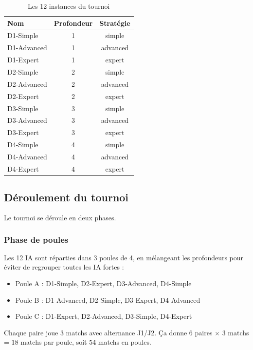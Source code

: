 \documentclass[a4paper, 12pt]{report}
\begin{document}
\begin{table}[H]
\centering
\caption{Les 12 instances du tournoi}
\label{tab:participants}
\begin{tabular}{lcc}
\toprule
\textbf{Nom} & \textbf{Profondeur} & \textbf{Stratégie} \\
\midrule
D1-Simple & 1 & simple \\
D1-Advanced & 1 & advanced \\
D1-Expert & 1 & expert \\
D2-Simple & 2 & simple \\
D2-Advanced & 2 & advanced \\
D2-Expert & 2 & expert \\
D3-Simple & 3 & simple \\
D3-Advanced & 3 & advanced \\
D3-Expert & 3 & expert \\
D4-Simple & 4 & simple \\
D4-Advanced & 4 & advanced \\
D4-Expert & 4 & expert \\
\bottomrule
\end{tabular}
\end{table}

\subsection{Déroulement du tournoi}

Le tournoi se déroule en deux phases.

\subsubsection{Phase de poules}

Les 12 IA sont réparties dans 3 poules de 4, en mélangeant les profondeurs pour éviter de regrouper toutes les IA fortes :

\begin{itemize}
    \item Poule A : D1-Simple, D2-Expert, D3-Advanced, D4-Simple
    \item Poule B : D1-Advanced, D2-Simple, D3-Expert, D4-Advanced
    \item Poule C : D1-Expert, D2-Advanced, D3-Simple, D4-Expert
\end{itemize}

Chaque paire joue 3 matchs avec alternance J1/J2. Ça donne 6 paires $\times$ 3 matchs = 18 matchs par poule, soit 54 matchs en poules.
\end{document}
